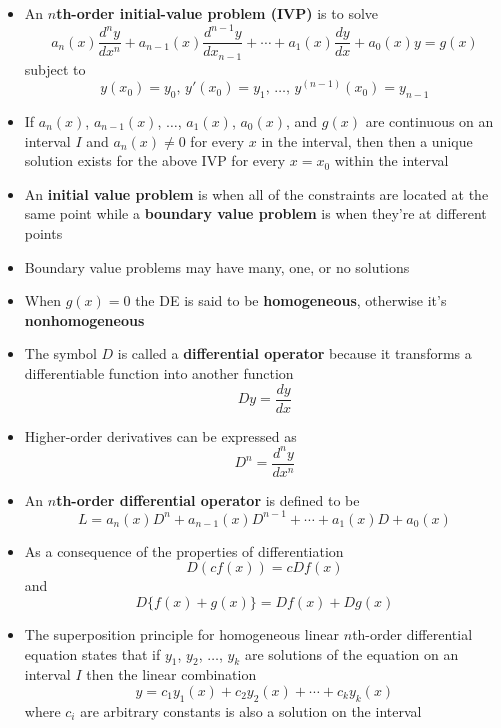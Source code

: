 \documentclass{article}
\begin{document}
\begin{itemize}
  \item An \textbf{$n$th-order initial-value problem (IVP)} is to solve \[a_n(x) \frac{d^ny}{dx^n} + a_{n - 1}(x) \frac{d^{n - 1}y}{dx_{n - 1}} + \cdots + a_1(x) \frac{dy}{dx} + a_0(x) y = g(x)\] subject to \[y(x_0) = y_0, \,y'(x_0) = y_1, \,\ldots, \,y^{(n - 1)}(x_0) = y_{n - 1}\]

  \item If $a_n(x)$, $a_{n - 1}(x)$, $\ldots$, $a_1(x)$, $a_0(x)$, and $g(x)$ are continuous on an interval $I$ and $a_n(x) \ne 0$ for every $x$ in the interval, then then a unique solution exists for the above IVP for every $x = x_0$ within the interval

  \item An \textbf{initial value problem} is when all of the constraints are located at the same point while a \textbf{boundary value problem} is when they're at different points

  \item Boundary value problems may have many, one, or no solutions

  \item When $g(x) = 0$ the DE is said to be \textbf{homogeneous}, otherwise it's \textbf{nonhomogeneous}

  \item The symbol $D$ is called a \textbf{differential operator} because it transforms a differentiable function into another function \[Dy = \frac{dy}{dx}\]

  \item Higher-order derivatives can be expressed as \[D^n = \frac{d^ny}{dx^n}\]

  \item An \textbf{$n$th-order differential operator} is defined to be \[L = a_n(x) D^n + a_{n - 1}(x) D^{n - 1} + \cdots + a_1(x) D + a_0(x)\]

  \item As a consequence of the properties of differentiation \[D(cf(x)) = cDf(x)\] and \[D\{f(x) + g(x)\} = Df(x) + Dg(x)\]

  \item The superposition principle for homogeneous linear $n$th-order differential equation states that if $y_1$, $y_2$, $\ldots$, $y_k$ are solutions of the equation on an interval $I$ then the linear combination \[y = c_1 y_1(x) + c_2 y_2(x) + \cdots + c_k y_k(x)\] where $c_i$ are arbitrary constants is also a solution on the interval


\end{itemize}
\end{document}
